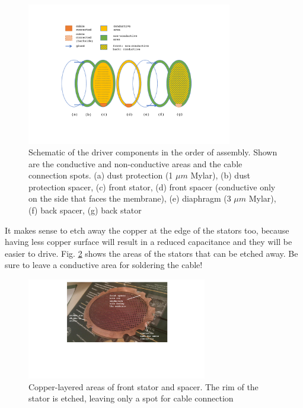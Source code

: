 \documentclass{article}
\begin{document}
\begin{figure}[htb]
    \centering
    \includegraphics[width=0.8\textwidth]{images/schematic_driver.pdf}
    \caption{Schematic of the driver components in the order of assembly. Shown are the conductive and non-conductive areas and the cable connection spots.
    (a) dust protection (1 $\mu m$ Mylar), (b) dust protection spacer, (c) front stator, (d) front spacer (conductive only on the side that faces the membrane), (e) diaphragm (3 $\mu m$ Mylar), (f) back spacer, (g) back stator
    }
    \label{f:driver:schematic}
\end{figure}

It makes sense to etch away the copper at the edge of the stators too, because having less copper surface will result in a reduced capacitance and they will be easier to drive. Fig. \ref{f:etching:stator} shows the areas of the stators that can be etched away. Be sure to leave a conductive area for soldering the cable!

\begin{figure}[htb]
    \centering
    \includegraphics[width=0.7\textwidth]{images/etching_stator_spacer.pdf}
    \caption{Copper-layered areas of front stator and spacer. The rim of the stator is etched, leaving only a spot for cable connection}
    \label{f:etching:stator}
\end{figure}
\end{document}
